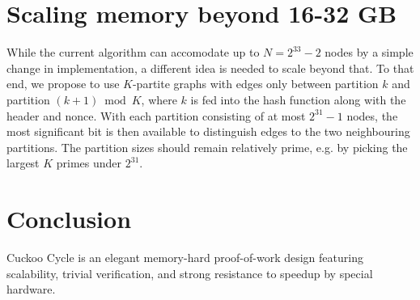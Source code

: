 \documentclass[11pt, oneside]{article}
\begin{document}
\section{Scaling memory beyond 16-32 GB}
While the current algorithm can accomodate up to $N=2^{33}-2$ nodes by a simple change
in implementation, a different idea is needed to scale beyond that.
To that end, we propose to use $K$-partite graphs with edges only between partition $k$ and partition $(k+1) \bmod K$,
where $k$ is fed into the hash function along with the header and nonce. With each partition consisting of at most
$2^31-1$ nodes, the most significant bit is then available to distinguish edges to the two neighbouring partitions.
The partition sizes should remain relatively prime, e.g. by picking the largest $K$ primes under $2^{31}$.

\section{Conclusion}
Cuckoo Cycle is an elegant memory-hard proof-of-work design featuring
scalability, trivial verification, and strong resistance to speedup by special hardware.



\end{document}
